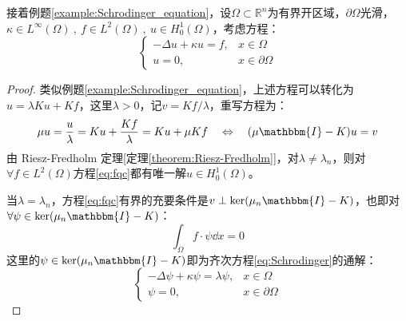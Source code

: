 \begin{example}
接着例题\ref{example:Schrodinger_equation}，设$\Omega \subset \mathbb{R}^n$为有界开区域，$\partial\Omega$光滑，$\kappa \in L^{\infty}(\Omega) \ , \ f \in L^2(\Omega) \ , \ u \in H^1_0(\Omega)$，考虑方程：
\begin{equation}\label{eq:fqc}
\left\{\begin{array}{rl}
-\Delta u+\kappa u = f, & x \in \Omega \\
u=0, & x \in \partial\Omega
\end{array}\right.
\end{equation}
\end{example}
\begin{proof}
类似例题\ref{example:Schrodinger_equation}，上述方程可以转化为$u=\lambda Ku+Kf$，这里$\lambda>0$，记$v=Kf/\lambda$，重写方程为：
\[\mu u=\frac{u}{\lambda}=Ku+\frac{Kf}{\lambda}=Ku+\mu Kf \quad \Leftrightarrow \quad (\mu\mathbbm{I}-K)u=v\]
由 Riesz-Fredholm 定理[定理\ref{theorem:Riesz-Fredholm}]，对$\lambda \neq \lambda_n$，则对$\forall f \in L^2(\Omega)$方程\eqref{eq:fqc}都有唯一解$u \in H_0^1(\Omega)$。

当$\lambda=\lambda_n$，方程\eqref{eq:fqc}有界的充要条件是$v \perp \ker(\mu_n\mathbbm{I}-K)$，也即对$\forall \psi \in \ker(\mu_n\mathbbm{I}-K)$：
\[\int_{\Omega}f\cdot\psi\dd{x}=0\]
这里的$\psi \in \ker(\mu_n\mathbbm{I}-K)$即为齐次方程\eqref{eq:Schrodinger}的通解：
\[\left\{\begin{array}{rl}
-\Delta \psi+\kappa \psi = \lambda \psi, & x \in \Omega \\
\psi=0, & x \in \partial\Omega
\end{array}\right.\]
\end{proof}

